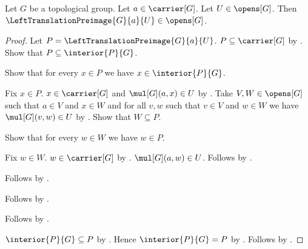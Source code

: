 \begin{theorem}\label{left_translation_preimage_open}
    Let $G$ be a topological group.
    Let $a\in\carrier[G]$.
    Let $U\in\opens[G]$.
    Then $\LeftTranslationPreimage{G}{a}{U}\in\opens[G]$.
\end{theorem}
\begin{proof}
    Let $P=\LeftTranslationPreimage{G}{a}{U}$.
    $P\subseteq\carrier[G]$ by .
    Show that $P\subseteq\interior{P}{G}$.
    \begin{subproof}
        Show that for every $x\in P$ we have $x\in\interior{P}{G}$.
        \begin{subproof}
            Fix $x\in P$.
            $x\in\carrier[G]$ and $\mul[G](a,x)\in U$
                by .
            Take $V,W\in\opens[G]$ such that $a\in V$ and $x\in W$
                and for all $v,w$ such that $v\in V$ and $w\in W$
                we have $\mul[G](v,w)\in U$
                by .
            Show that $W\subseteq P$.
            \begin{subproof}
                Show that for every $w\in W$ we have $w\in P$.
                \begin{subproof}
                    Fix $w\in W$.
                    $w\in\carrier[G]$
                        by .
                    $\mul[G](a,w)\in U$.
                    Follows by .
                \end{subproof}
                Follows by .
            \end{subproof}
            Follows by .
        \end{subproof}
        Follows by .
    \end{subproof}
    $\interior{P}{G}\subseteq P$ by .
    Hence $\interior{P}{G}=P$ by .
    Follows by
        .
\end{proof}

